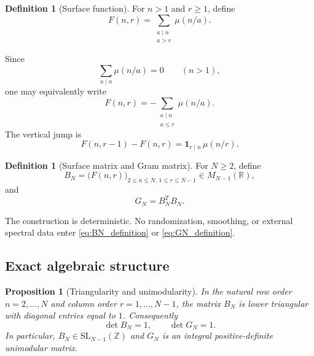 \documentclass[11pt]{amsart}
\numberwithin{equation}{section}
\theoremstyle{plain}
\newtheorem{proposition}[theorem]{Proposition}
\theoremstyle{definition}
\newtheorem{definition}[theorem]{Definition}
\theoremstyle{remark}
\newcommand{\mob}{\mu}
\begin{document}
\begin{definition}[Surface function]
\label{def:surface_function}
For $n>1$ and $r\ge1$, define
\begin{equation}
F(n,r)=\sum_{\substack{a\mid n\\a>r}}\mob(n/a).
\label{eq:surface_definition}
\end{equation}
\end{definition}

Since
\begin{equation}
\sum_{a\mid n}\mob(n/a)=0
\qquad(n>1),
\label{eq:mobius_divisor_zero}
\end{equation}
one may equivalently write
\begin{equation}
F(n,r)=-\sum_{\substack{a\mid n\\a\le r}}\mob(n/a).
\label{eq:surface_prefix_form}
\end{equation}
The vertical jump is
\begin{equation}
F(n,r-1)-F(n,r)=\mathbf 1_{r\mid n}\,\mob(n/r).
\label{eq:vertical_jump}
\end{equation}

\begin{definition}[Surface matrix and Gram matrix]
\label{def:surface_gram}
For $N\ge2$, define
\begin{equation}
B_N=\bigl(F(n,r)\bigr)_{2\le n\le N,\,1\le r\le N-1}
\in M_{N-1}(\mathbb R),
\label{eq:BN_definition}
\end{equation}
and
\begin{equation}
G_N=B_N^TB_N.
\label{eq:GN_definition}
\end{equation}
\end{definition}

The construction is deterministic.  No randomization, smoothing, or external spectral data enter \eqref{eq:BN_definition} or \eqref{eq:GN_definition}.

\subsection{Exact algebraic structure}
\label{subsec:exact_structure}

\begin{proposition}[Triangularity and unimodularity]
\label{prop:triangular_unimodular}
In the natural row order $n=2,\ldots,N$ and column order $r=1,\ldots,N-1$, the matrix $B_N$ is lower triangular with diagonal entries equal to $1$.  Consequently
\begin{equation}
\det B_N=1,
\qquad
\det G_N=1.
\label{eq:determinants_one}
\end{equation}
In particular, $B_N\in \mathrm{SL}_{N-1}(\mathbb Z)$ and $G_N$ is an integral positive-definite unimodular matrix.
\end{proposition}
\end{document}
